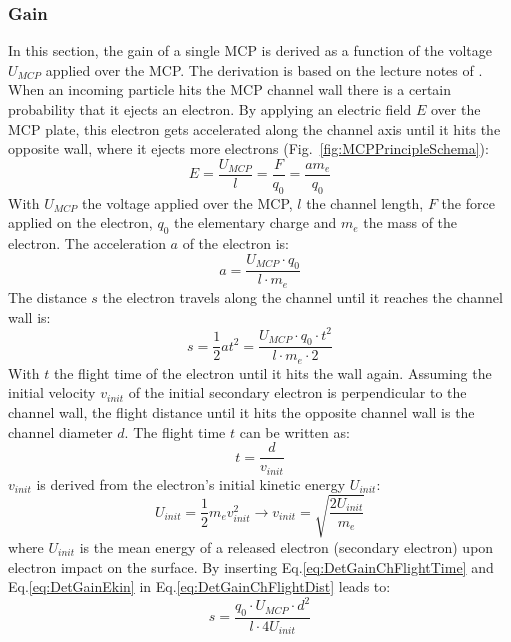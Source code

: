 	\subsubsection{Gain}
	In this section, the gain of a single MCP is derived as a function of the voltage $U_{MCP}$ applied over the MCP. The derivation is based on the lecture notes of \cite{LecNot_Wurz2017}. When an incoming particle hits the MCP channel wall there is a certain probability that it ejects an electron. By applying an electric field $E$ over the MCP plate, this electron gets accelerated along the channel axis until it hits the opposite wall, where it ejects more electrons (Fig.~\ref{fig:MCPPrincipleSchema}):
	\begin{equation}
		E = \frac{U_{MCP}}{l} = \frac{F}{q_0} = \frac{a m_e}{q_0}
	\end{equation}
	With $U_{MCP}$ the voltage applied over the MCP, $l$ the channel length, $F$ the force applied on the electron, $q_0$ the elementary charge and $m_e$ the mass of the electron. The acceleration $a$ of the electron is:		
	\begin{equation}
		a = \frac{U_{MCP}\cdot q_0}{l\cdot m_e}
	\end{equation}
	The distance $s$ the electron travels along the channel until it reaches the channel wall is:
	\begin{equation}
		s = \frac{1}{2}at^2 = \frac{U_{MCP}\cdot q_0\cdot t^2}{l\cdot m_e\cdot 2}
		\label{eq:DetGainChFlightDist}
	\end{equation}
	With $t$ the flight time of the electron until it hits the wall again. Assuming the initial velocity $v_{init}$ of the initial secondary electron is perpendicular to the channel wall, the flight distance until it hits the opposite channel wall is the channel diameter $d$. The flight time $t$ can be written as:
	\begin{equation}
		t = \frac{d}{v_{init}}
		\label{eq:DetGainChFlightTime}
	\end{equation}
	$v_{init}$ is derived from the electron's initial kinetic energy $U_{init}$:
	\begin{equation}
		U_{init} = \frac{1}{2}m_e v_{init}^2 \rightarrow v_{init} = \sqrt{\frac{2U_{init}}{m_e}}
		\label{eq:DetGainEkin}
	\end{equation}
	where $U_{init}$ is the mean energy of a released electron (secondary electron) upon electron impact on the surface. By inserting Eq.\eqref{eq:DetGainChFlightTime} and Eq.\eqref{eq:DetGainEkin} in Eq.\eqref{eq:DetGainChFlightDist} leads to:
	\begin{equation}
		s = \frac{q_0 \cdot U_{MCP}\cdot d^2}{l\cdot 4U_{init}}
		\label{eq:DetGainDistECh}
	\end{equation}
